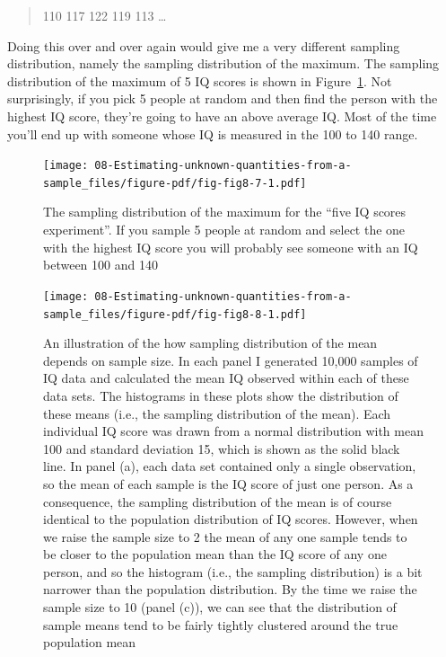 \documentclass[
  a4paper,
]{book}
\begin{document}
\begin{quote}
110 117 122 119 113 \ldots{}
\end{quote}

Doing this over and over again would give me a very different sampling
distribution, namely the sampling distribution of the maximum. The
sampling distribution of the maximum of 5 IQ scores is shown in
Figure~\ref{fig-fig8-7}. Not surprisingly, if you pick 5 people at
random and then find the person with the highest IQ score, they're going
to have an above average IQ. Most of the time you'll end up with someone
whose IQ is measured in the 100 to 140 range.

\begin{figure}

\texttt{[image: 08-Estimating-unknown-quantities-from-a-sample\_files/figure-pdf/fig-fig8-7-1.pdf]} \hfill{}

\caption{\label{fig-fig8-7}The sampling distribution of the maximum for
the ``five IQ scores experiment''. If you sample 5 people at random and
select the one with the highest IQ score you will probably see someone
with an IQ between 100 and 140}

\end{figure}

\begin{figure}

\texttt{[image: 08-Estimating-unknown-quantities-from-a-sample\_files/figure-pdf/fig-fig8-8-1.pdf]} \hfill{}

\caption{\label{fig-fig8-8}An illustration of the how sampling
distribution of the mean depends on sample size. In each panel I
generated 10,000 samples of IQ data and calculated the mean IQ observed
within each of these data sets. The histograms in these plots show the
distribution of these means (i.e., the sampling distribution of the
mean). Each individual IQ score was drawn from a normal distribution
with mean 100 and standard deviation 15, which is shown as the solid
black line. In panel (a), each data set contained only a single
observation, so the mean of each sample is the IQ score of just one
person. As a consequence, the sampling distribution of the mean is of
course identical to the population distribution of IQ scores. However,
when we raise the sample size to 2 the mean of any one sample tends to
be closer to the population mean than the IQ score of any one person,
and so the histogram (i.e., the sampling distribution) is a bit narrower
than the population distribution. By the time we raise the sample size
to 10 (panel (c)), we can see that the distribution of sample means tend
to be fairly tightly clustered around the true population mean}

\end{figure}
\end{document}
